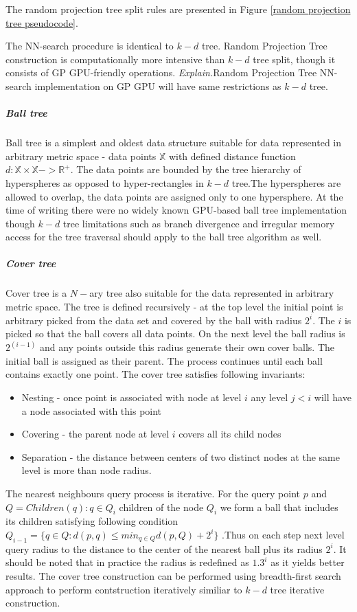 The random projection tree split rules are presented in Figure \ref{random
projection tree pseudocode}. 

The NN-search procedure is identical to $ k-d $ tree. 
Random Projection Tree construction is computationally more intensive than $
k-d $ tree split, though it consists of GP GPU-friendly operations.
\textit{Explain.}Random Projection Tree NN-search implementation on GP GPU will
have same restrictions as $ k-d $ tree.


\subparagraph*{Ball tree}
Ball tree\cite{Omohundro,1989} is a simplest and oldest data structure suitable
for data represented in arbitrary metric space - data points $ \mathbb{X}
$ with defined distance function $ d : \mathbb{X} \times \mathbb{X} ->
\mathbb{R}^+ $. The data points are bounded by
the tree hierarchy of hyperspheres as opposed to hyper-rectangles in $ k-d $
tree.The hyperspheres are allowed to overlap, the data points are
assigned only to one hypersphere.
At the time of writing there were no widely known GPU-based ball tree
implementation though $k-d$ tree limitations such as branch divergence and
irregular memory access for the tree traversal should apply to the ball tree
algorithm as well.

\subparagraph*{Cover tree}
Cover tree\cite{beygelzimer2006cover} is a $N-$ary tree also suitable for the
data represented in arbitrary metric space. The tree is defined recursively -
at the top level the initial point is arbitrary picked from the data set and
covered by the ball with radius $ 2^i $. The $ i $ is picked so that the
ball covers all data points. On the next level the ball radius is $ 2^(i-1) $ and any points outside this radius generate their own cover
balls. The initial ball is assigned as their parent. The process continues until
each ball contains exactly one point. The cover tree satisfies following
invariants:
\begin{itemize}
  \item Nesting - once point is associated with node  at level $ i $ any
  level $ j < i $ will have  a node associated with this point
  \item Covering - the parent node at level $ i $ covers all its child nodes
  \item Separation - the distance between centers of two distinct nodes at the
  same level is more than node radius.
\end{itemize} 
  
 The nearest neighbours query process is iterative. For the query
point $ p $ and $ Q = { Children(q) : q \in Q_i } $ children of the node $ Q_i $ we form a ball
that includes its children satisfying following condition 
$ Q_{i-1} =  \{q \in Q : d(p,q) \leq min_{q\in Q} d(p,Q) +2^i  \} $
\cite{beygelzimer2006cover}.Thus on each step next level query
radius to the distance to the center of the nearest ball plus its radius $ 2^i $. It should be noted that in practice
the radius is redefined as $ 1.3 ^ i $ as it yields better
results\cite{izbickifaster}.  
The cover tree construction can be performed using breadth-first search approach
to perform contstruction iteratively similiar to $ k-d $ tree iterative construction\cite{sharma2010design}.

